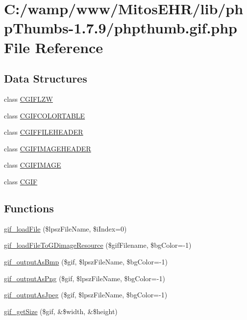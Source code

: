 \hypertarget{phpthumb_8gif_8php}{\section{\-C\-:/wamp/www/\-Mitos\-E\-H\-R/lib/php\-Thumbs-\/1.7.9/phpthumb.gif.\-php \-File \-Reference}
\label{phpthumb_8gif_8php}
}
\subsection*{\-Data \-Structures}
\begin{DoxyCompactItemize}
\item 
class \hyperlink{class_c_g_i_f_l_z_w}{\-C\-G\-I\-F\-L\-Z\-W}
\item 
class \hyperlink{class_c_g_i_f_c_o_l_o_r_t_a_b_l_e}{\-C\-G\-I\-F\-C\-O\-L\-O\-R\-T\-A\-B\-L\-E}
\item 
class \hyperlink{class_c_g_i_f_f_i_l_e_h_e_a_d_e_r}{\-C\-G\-I\-F\-F\-I\-L\-E\-H\-E\-A\-D\-E\-R}
\item 
class \hyperlink{class_c_g_i_f_i_m_a_g_e_h_e_a_d_e_r}{\-C\-G\-I\-F\-I\-M\-A\-G\-E\-H\-E\-A\-D\-E\-R}
\item 
class \hyperlink{class_c_g_i_f_i_m_a_g_e}{\-C\-G\-I\-F\-I\-M\-A\-G\-E}
\item 
class \hyperlink{class_c_g_i_f}{\-C\-G\-I\-F}
\end{DoxyCompactItemize}
\subsection*{\-Functions}
\begin{DoxyCompactItemize}
\item 
\hyperlink{phpthumb_8gif_8php_a3e0c977c34b2fd2deb6721fff7f7b2c1}{gif\-\_\-load\-File} (\$lpsz\-File\-Name, \$i\-Index=0)
\item 
\hyperlink{phpthumb_8gif_8php_ae1af166bb60f9b34e2ca2bc41f2de307}{gif\-\_\-load\-File\-To\-G\-Dimage\-Resource} (\$gif\-Filename, \$bg\-Color=-\/1)
\item 
\hyperlink{phpthumb_8gif_8php_a9a18ada0eaf504cbf7730917f7a4b6f0}{gif\-\_\-output\-As\-Bmp} (\$gif, \$lpsz\-File\-Name, \$bg\-Color=-\/1)
\item 
\hyperlink{phpthumb_8gif_8php_a7c3c95e2adc0ad30cf0ad43e8bbf483d}{gif\-\_\-output\-As\-Png} (\$gif, \$lpsz\-File\-Name, \$bg\-Color=-\/1)
\item 
\hyperlink{phpthumb_8gif_8php_ae17b541030dde7793bfa82da38eada10}{gif\-\_\-output\-As\-Jpeg} (\$gif, \$lpsz\-File\-Name, \$bg\-Color=-\/1)
\item 
\hyperlink{phpthumb_8gif_8php_ab7a9f9d5951f6afa2edbb543905033ad}{gif\-\_\-get\-Size} (\$gif, \&\$width, \&\$height)
\end{DoxyCompactItemize}



